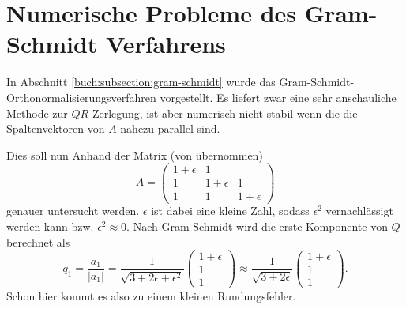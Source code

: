 %
%
%
\section{Numerische Probleme des Gram-Schmidt Verfahrens
\label{qr:section:problemstellung}}
In Abschnitt \ref{buch:subsection:gram-schmidt} wurde das Gram-Schmidt-Orthonormalisierungsverfahren vorgestellt.
Es liefert zwar eine sehr anschauliche Methode zur $QR$-Zerlegung, ist aber numerisch nicht stabil wenn die die Spaltenvektoren von $A$ nahezu parallel sind.

Dies soll nun Anhand der Matrix (von \cite{qr:tam} übernommen)
\begin{equation*}
A=\begin{pmatrix}
1+\epsilon&1&\\
1&1+\epsilon&1\\
1&1&1+\epsilon
\end{pmatrix}
\end{equation*}
genauer untersucht werden.
$\epsilon$ ist dabei eine \glqq kleine\grqq{} Zahl, sodass $\epsilon^2$ vernachlässigt werden kann bzw. $\epsilon^2\approx0$.
Nach Gram-Schmidt wird die erste Komponente von $Q$ berechnet als
\begin{equation*}
q_1=\frac{a_1}{|a_1|}=\frac{1}{\sqrt{3+2\epsilon+\epsilon^2}}
\begin{pmatrix}
1+\epsilon\\
1\\
1
\end{pmatrix}\approx\frac{1}{\sqrt{3+2\epsilon}}
\begin{pmatrix}
1+\epsilon\\
1\\
1
\end{pmatrix}.
\end{equation*}
Schon hier kommt es also zu einem kleinen Rundungsfehler.

